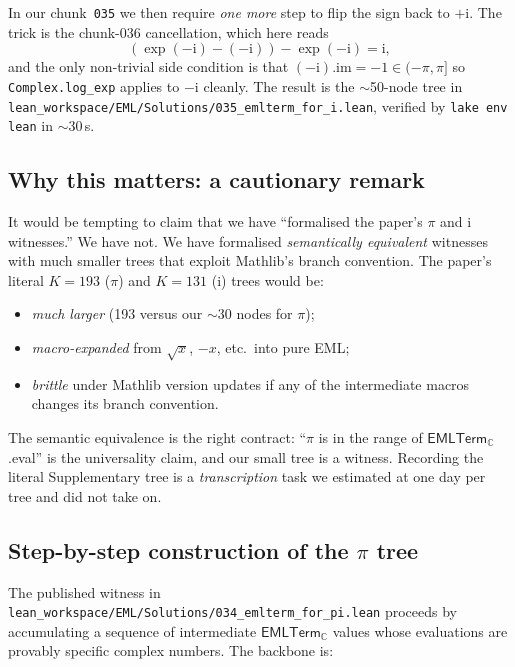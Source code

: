 \documentclass[11pt,a4paper]{article}
\theoremstyle{plain}
\theoremstyle{definition}
\newcommand{\C}{\mathbb{C}}
\newcommand{\imu}{\mathrm{i}}
\newcommand{\EMLTC}{\mathsf{EMLTerm}_\C}
\begin{document}
In our chunk~\texttt{035} we then require \emph{one more} step to
flip the sign back to $+\imu$.  The trick is the chunk-036
cancellation, which here reads
\[
   (\exp(-\imu) - (-\imu)) - \exp(-\imu) = \imu,
\]
and the only non-trivial side condition is that
$(-\imu).\mathrm{im} = -1 \in (-\pi,\pi]$ so
\texttt{Complex.log\_exp} applies to $-\imu$ cleanly.  The result is
the $\sim$50-node tree in
\texttt{lean\_workspace/EML/Solutions/035\_emlterm\_for\_i.lean},
verified by \texttt{lake env lean} in $\sim$30\,s.

\subsection{Why this matters: a cautionary remark}

It would be tempting to claim that we have ``formalised the paper's
$\pi$ and $\imu$ witnesses.''  We have not.  We have formalised
\emph{semantically equivalent} witnesses with much smaller trees
that exploit Mathlib's branch convention.  The paper's literal $K=193$
($\pi$) and $K=131$ ($\imu$) trees would be:

\begin{itemize}[leftmargin=*,nosep]
\item \emph{much larger} (193 versus our $\sim$30 nodes for $\pi$);
\item \emph{macro-expanded} from $\sqrt{x}$, $-x$, etc.~into pure EML;
\item \emph{brittle} under Mathlib version updates if any of the
intermediate macros changes its branch convention.
\end{itemize}

The semantic equivalence is the right contract: ``$\pi$ is in the
range of $\EMLTC$.eval'' is the universality claim, and our small tree
is a witness.  Recording the literal Supplementary tree is a
\emph{transcription} task we estimated at one day per tree and did not
take on.

\subsection{Step-by-step construction of the $\pi$ tree}

The published witness in
\texttt{lean\_workspace/EML/Solutions/034\_emlterm\_for\_pi.lean}
proceeds by accumulating a sequence of intermediate $\EMLTC$ values
whose evaluations are provably specific complex numbers.  The
backbone is:
\end{document}

